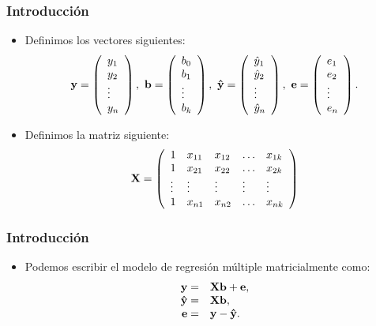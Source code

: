\begin{frame}
\frametitle{Introducción}
\begin{itemize}
\item<2->{Definimos los vectores siguientes:
$$
\mathbf{y}=
\left(
\begin{array}{l}
y_1\\ y_2\\\vdots\\ y_n
\end{array}\right),\  \mathbf{b}=\left(
\begin{array}{l}
b_0\\ b_1\\\vdots\\b_k
\end{array}\right),\ \mathbf{\hat{y}}=\left(
\begin{array}{l}
\hat{y}_1\\ \hat{y}_2\\\vdots\\\hat{y}_n
\end{array}\right),\ \mathbf{e}=\left(
\begin{array}{l}
e_1\\ e_2\\\vdots\\ e_n
\end{array}\right).
$$}
\item<3->{Definimos la matriz siguiente:
$$
\mathbf{X}=\left(
\begin{array}{lllll}
1&x_{11}&x_{12}&\ldots&x_{1k}\\
1&x_{21}&x_{22}&\ldots&x_{2k}\\
\vdots&\vdots&\vdots&\vdots&\vdots\\
1&x_{n1}&x_{n2}&\ldots&x_{nk}
\end{array}
\right)$$}
\end{itemize}
\end{frame}
\begin{frame}
\frametitle{Introducción}
\begin{itemize}
\item<2->{Podemos escribir el modelo de regresión múltiple matricialmente como:
$$
\begin{array}{rl}
\mathbf{y}= & \mathbf{X}\mathbf{b}+\mathbf{e},\\
\mathbf{\hat{y}} = & \mathbf{X}\mathbf{b}, \\
\mathbf{e} = & \mathbf{y}-\mathbf{\hat{y}}.
\end{array}$$}
\end{itemize}
\end{frame}

